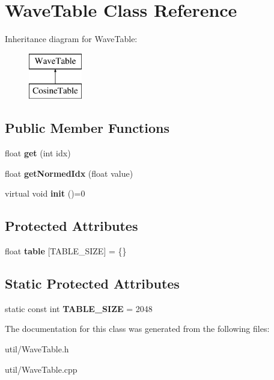\hypertarget{classWaveTable}{}\section{Wave\+Table Class Reference}
\label{classWaveTable}
Inheritance diagram for Wave\+Table\+:\begin{figure}[H]
\begin{center}
\leavevmode
\includegraphics[height=2.000000cm]{classWaveTable}
\end{center}
\end{figure}
\subsection*{Public Member Functions}
\begin{DoxyCompactItemize}
\item 
float {\bfseries get} (int idx)\hypertarget{classWaveTable_afd23f7ecfb0b1bfb15164c49b7d9c95e}{}\label{classWaveTable_afd23f7ecfb0b1bfb15164c49b7d9c95e}

\item 
float {\bfseries get\+Normed\+Idx} (float value)\hypertarget{classWaveTable_a3fa4d93994b56dee6f0083e063dd53b5}{}\label{classWaveTable_a3fa4d93994b56dee6f0083e063dd53b5}

\item 
virtual void {\bfseries init} ()=0\hypertarget{classWaveTable_addb817963f443ed6edaba3be9b8edec5}{}\label{classWaveTable_addb817963f443ed6edaba3be9b8edec5}

\end{DoxyCompactItemize}
\subsection*{Protected Attributes}
\begin{DoxyCompactItemize}
\item 
float {\bfseries table} \mbox{[}T\+A\+B\+L\+E\+\_\+\+S\+I\+ZE\mbox{]} = \{\}\hypertarget{classWaveTable_aac70194676deffaf65f02a79f9d49aeb}{}\label{classWaveTable_aac70194676deffaf65f02a79f9d49aeb}

\end{DoxyCompactItemize}
\subsection*{Static Protected Attributes}
\begin{DoxyCompactItemize}
\item 
static const int {\bfseries T\+A\+B\+L\+E\+\_\+\+S\+I\+ZE} = 2048\hypertarget{classWaveTable_ae8fe89b58ec31a5beda1bfc79d1c39ad}{}\label{classWaveTable_ae8fe89b58ec31a5beda1bfc79d1c39ad}

\end{DoxyCompactItemize}


The documentation for this class was generated from the following files\+:\begin{DoxyCompactItemize}
\item 
util/Wave\+Table.\+h\item 
util/Wave\+Table.\+cpp\end{DoxyCompactItemize}
